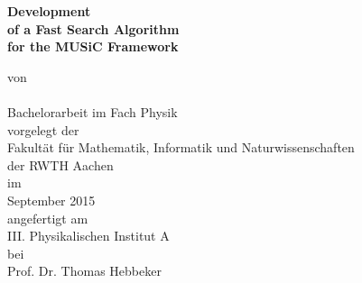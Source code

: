 
\makeatletter
\begin{titlepage}
		\tgherosfont
		\centering
		
		\Large
		
		\vspace*{\fill}
		
		{
			\fontsize{30pt}{28pt}\selectfont\bfseries \color{ctcolormain}
			Development \\ 
			of a Fast Search Algorithm \\ 
			for the MUSiC Framework \\
		}
		
		\vspace{16mm}
		
		\textsf{von} \\
		{\LARGE \@author} \\[40mm]
		
		Bachelorarbeit im Fach Physik \\[16mm]
		
		\textsf{vorgelegt der} \\
		Fakultät für Mathematik, Informatik und Naturwissenschaften \\der RWTH Aachen \\[8mm]
		
		\textsf{im} \\
		September 2015 \\[8mm]
		
		\textsf{angefertigt am} \\
		III. Physikalischen Institut A \\[8mm]
		
		\textsf{bei} \\
		Prof. Dr. Thomas Hebbeker \\
\end{titlepage}
\makeatother